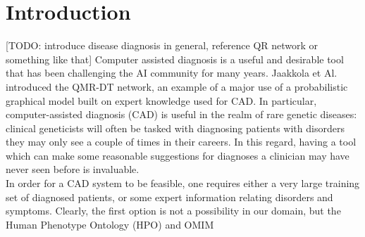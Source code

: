\section{Introduction}
\label{sec:intro}

[TODO: introduce disease diagnosis in general, reference QR network or something like that]
Computer assisted diagnosis is a useful and desirable tool that has been challenging the AI community for many years. Jaakkola et Al. \cite{qmrdt} introduced the QMR-DT network, an example of a major use of a probabilistic graphical model built on expert knowledge used for CAD. 
In particular, computer-assisted diagnosis (CAD) is useful in the realm of rare genetic diseases: clinical geneticists will often be tasked with diagnosing patients with disorders they may only see a couple of times in their careers. In this regard, having a tool which can make some reasonable suggestions for diagnoses a clinician may have never seen before is invaluable. \\
In order for a CAD system to be feasible, one requires either a very large training set of diagnosed patients, or some expert information relating disorders and symptoms. Clearly, the first option is not a possibility in our domain, but the Human Phenotype Ontology (HPO) \cite{kohler2014hpo} and OMIM \cite{omim}

